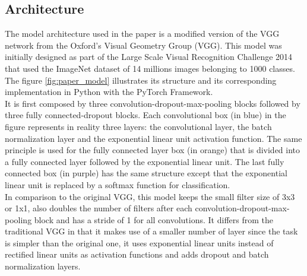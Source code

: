 \subsection{Architecture}
The model architecture used in the paper is a modified version of the VGG network from the Oxford's Visual Geometry Group (VGG). This model was initially designed as part of the Large Scale Visual Recognition Challenge 2014 that used the ImageNet dataset of 14 millions images belonging to 1000 classes. The figure \ref{fig:paper_model} illustrates its structure and its corresponding implementation in Python with the PyTorch Framework.\\
It is first composed by three convolution-dropout-max-pooling blocks followed by three fully connected-dropout blocks. Each convolutional box (in blue) in the figure represents in reality three layers: the convolutional layer, the batch normalization layer and the exponential linear unit activation function. The same principle is used for the fully connected layer box (in orange) that is divided into a fully connected layer followed by the exponential linear unit. The last fully connected box (in purple) has the same structure except that the exponential linear unit is replaced by a softmax  function for classification.\\
In comparison to the original VGG, this model keeps the small filter size of 3x3 or 1x1,  also doubles the number of filters after each convolution-dropout-max-pooling block and has a stride of 1 for all convolutions. It differs from the traditional VGG in that it makes use of a smaller number of layer since the task is simpler than the original one, it uses exponential linear units instead of rectified linear units as activation functions and adds dropout and batch normalization layers.

